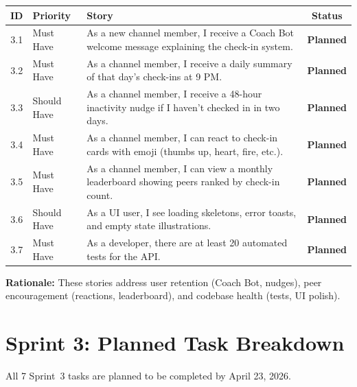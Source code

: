 \documentclass[11pt]{article}
\begin{document}
\begin{center}
\begin{tabularx}{\textwidth}{@{}clXc@{}}
\toprule
\textbf{ID} & \textbf{Priority} & \textbf{Story} & \textbf{Status} \\
\midrule
3.1 & Must Have & As a new channel member, I receive a Coach Bot welcome message explaining the check-in system. & \textbf{Planned} \\
3.2 & Must Have & As a channel member, I receive a daily summary of that day's check-ins at 9 PM. & \textbf{Planned} \\
3.3 & Should Have & As a channel member, I receive a 48-hour inactivity nudge if I haven't checked in in two days. & \textbf{Planned} \\
3.4 & Must Have & As a channel member, I can react to check-in cards with emoji (thumbs up, heart, fire, etc.). & \textbf{Planned} \\
3.5 & Must Have & As a channel member, I can view a monthly leaderboard showing peers ranked by check-in count. & \textbf{Planned} \\
3.6 & Should Have & As a UI user, I see loading skeletons, error toasts, and empty state illustrations. & \textbf{Planned} \\
3.7 & Must Have & As a developer, there are at least 20 automated tests for the API. & \textbf{Planned} \\
\bottomrule
\end{tabularx}
\end{center}

\textbf{Rationale:} These stories address user retention (Coach Bot, nudges), peer encouragement (reactions, leaderboard), and codebase health (tests, UI polish).

\section{Sprint 3: Planned Task Breakdown}

All 7 Sprint~3 tasks are planned to be completed by April 23, 2026.
\end{document}
